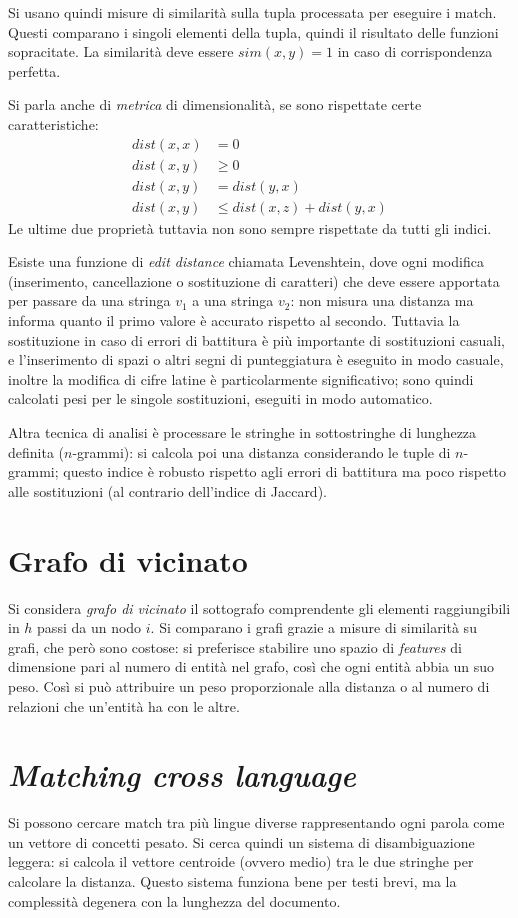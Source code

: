 \documentclass[11pt]{article}
\begin{document}
Si usano quindi misure di similarità sulla tupla processata per eseguire i match.
Questi comparano i singoli elementi della tupla, quindi il risultato delle funzioni sopracitate.
La similarità deve essere $sim(x, y) = 1$ in caso di corrispondenza perfetta.

Si parla anche di \textit{metrica} di dimensionalità, se sono rispettate certe caratteristiche:
\begin{align*}
  dist(x, x) &= 0 \\
  dist(x, y) &\ge 0 \\
  dist(x, y) &= dist(y, x) \\
  dist(x, y) &\le dist(x, z) + dist(y, x)
\end{align*}
Le ultime due proprietà tuttavia non sono sempre rispettate da tutti gli indici.

Esiste una funzione di \textit{edit distance} chiamata Levenshtein, dove ogni modifica (inserimento, cancellazione o sostituzione di caratteri) che deve essere apportata per passare da una stringa $v_1$ a una stringa $v_2$: non misura una distanza ma informa quanto il primo valore è accurato rispetto al secondo.
Tuttavia la sostituzione in caso di errori di battitura è più importante di sostituzioni casuali, e l'inserimento di spazi o altri segni di punteggiatura è eseguito in modo casuale, inoltre la modifica di cifre latine è particolarmente significativo; sono quindi calcolati pesi per le singole sostituzioni, eseguiti in modo automatico.

Altra tecnica di analisi è processare le stringhe in sottostringhe di lunghezza definita ($n$-grammi): si calcola poi una distanza considerando le tuple di $n$-grammi; questo indice è robusto rispetto agli errori di battitura ma poco rispetto alle sostituzioni (al contrario dell'indice di Jaccard).

\section{Grafo di vicinato}
Si considera \textit{grafo di vicinato} il sottografo comprendente gli elementi raggiungibili in $h$ passi da un nodo $i$.
Si comparano i grafi grazie a misure di similarità su grafi, che però sono costose: si preferisce stabilire uno spazio di \textit{features} di dimensione pari al numero di entità nel grafo, così che ogni entità abbia un suo peso.
Così si può attribuire un peso proporzionale alla distanza o al numero di relazioni che un'entità ha con le altre.

\section{\textit{Matching cross language}}
Si possono cercare match tra più lingue diverse rappresentando ogni parola come un vettore di concetti pesato.
Si cerca quindi un sistema di disambiguazione leggera: si calcola il vettore centroide (ovvero medio) tra le due stringhe per calcolare la distanza.
Questo sistema funziona bene per testi brevi, ma la complessità degenera con la lunghezza del documento.
\end{document}
